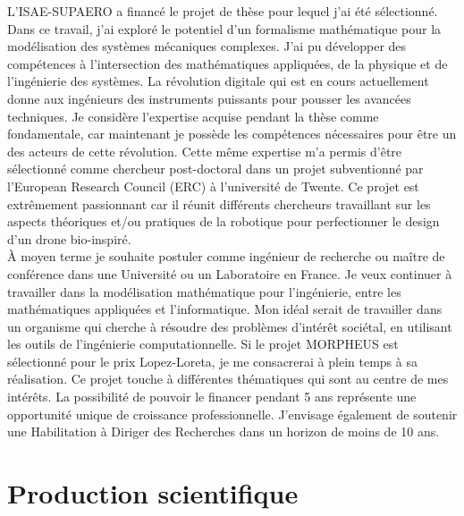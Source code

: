 \documentclass[12pt, french]{article}
\begin{document}
	L'ISAE-SUPAERO a financé le projet de thèse pour lequel j'ai été sélectionné. Dans ce travail, j'ai exploré le potentiel d'un formalisme mathématique pour la modélisation des systèmes mécaniques complexes. J'ai pu développer des compétences à l'intersection des mathématiques appliquées, de la physique et de l'ingénierie des systèmes. La révolution digitale qui est en cours actuellement donne aux ingénieurs des instruments puissants pour pousser les avancées techniques. Je considère l'expertise acquise pendant la thèse comme fondamentale, car maintenant je possède les compétences nécessaires pour être un des acteurs de cette révolution. Cette même expertise m'a permis d'être sélectionné comme chercheur post-doctoral dans un projet subventionné par l'European Research Council (ERC) à l'université de Twente. Ce projet est extrêmement passionnant car il réunit différents chercheurs travaillant sur les aspects théoriques et/ou pratiques de la robotique pour perfectionner le design d'un drone bio-inspiré. \\
	
	\`A moyen terme je souhaite postuler comme ingénieur de recherche ou maître de conférence dans une Université ou un Laboratoire en France. Je veux continuer à travailler dans la modélisation mathématique pour l'ingénierie, entre les mathématiques appliquées et l'informatique. Mon idéal serait de travailler dans un organisme qui cherche à résoudre des problèmes d'intérêt sociétal, en utilisant les outils de l'ingénierie computationnelle.  Si le projet MORPHEUS est sélectionné pour le prix Lopez-Loreta, je me consacrerai à plein temps à sa réalisation. Ce projet touche à différentes thématiques qui sont au centre de mes intérêts. La possibilité de pouvoir le financer pendant 5 ans représente une opportunité unique de croissance professionnelle. J'envisage également de soutenir une Habilitation à Diriger des Recherches dans un horizon de moins de 10 ans.
	
	
	\section{Production scientifique}
	{
		
		
	}
	
\end{document}
